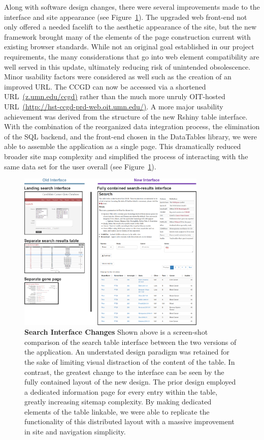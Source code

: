 \documentclass[10pt]{report}
\begin{document}
Along with software design changes, there were several improvements made to the interface and site appearance (see Figure~\ref{fig:interface}). The upgraded web front-end not only offered a needed facelift to the aesthetic appearance of the site, but the new framework brought many of the elements of the page construction current with existing browser standards. While not an original goal established in our project requirements, the many considerations that go into web element compatibility are well served in this update, ultimately reducing risk of unintended obsolescence. Minor usability factors were considered as well such as the creation of an improved URL\@. The CCGD can now be accessed via a shortened URL~\href{https://z.umn.edu/ccgd}{(z.umn.edu/ccgd)} rather than the much more unruly OIT-hosted URL~\href{http://hst-ccgd-prd-web.oit.umn.edu/}{(http://hst-ccgd-prd-web.oit.umn.edu/)}. A more major usability achievement was derived from the structure of the new Rshiny table interface. With the combination of the reorganized data integration process, the elimination of the SQL backend, and the front-end chosen in the DataTables library, we were able to assemble the application as a single page. This dramatically reduced broader site map complexity and simplified the process of interacting with the same data set for the user overall (see Figure~\ref{fig:interface}).

\begin{figure}[H]
    \center{}
    \includegraphics[width=0.8\textwidth]{fig/interface.pdf}
    \caption[Search Interface Changes]{\textbf{Search Interface Changes} Shown above is a screen-shot comparison of the search table interface between the two versions of the application. An understated design paradigm was retained for the sake of limiting visual distraction of the content of the table. In contrast, the greatest change to the interface can be seen by the fully contained layout of the new design. The prior design employed a dedicated information page for every entry within the table, greatly increasing sitemap complexity. By making dedicated elements of the table linkable, we were able to replicate the functionality of this distributed layout with a massive improvement in site and navigation simplicity.}\label{fig:interface}
\end{figure}
\end{document}
